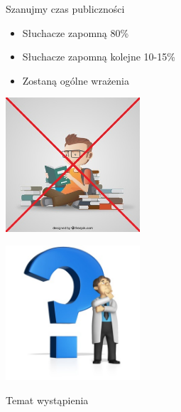 \documentclass{beamer}
\begin{document}
\begin{frame}{}
	\begin{center}
		\Huge{Szanujmy czas publiczności}
	\end{center}
\end{frame}

\begin{frame}{}
	\begin{Large}
		\begin{itemize}
			\item Słuchacze zapomną 80\%
			\item Słuchacze zapomną kolejne 10-15\%
			\item Zostaną ogólne wrażenia
		\end{itemize}
	\end{Large}
\end{frame}

\begin{frame}{}
	\begin{center}
  		\includegraphics[height=5cm]{nauka.jpg}
	\end{center}
\end{frame}

\begin{frame}{}
	\begin{center}
  		\includegraphics[height=5cm]{refleksja2.jpg}
	\end{center}
\end{frame}

\begin{frame}{}
	\begin{center}
		\Huge{Temat wystąpienia}
	\end{center}
\end{frame}
\end{document}

